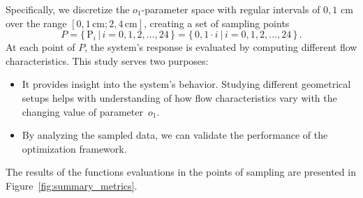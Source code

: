 Specifically, we discretize the $o_1$-parameter space with regular intervals of $0{,}1$ cm over the range $[0{,}1 \, \mathrm{cm}; 2{,}4 \, \mathrm{cm}]$, creating a set of sampling points
\begin{equation}
	P = \Big\{ \, \text{P}_i \, \big| \, i=0,1,2, \dots, 24 \, \Big\} = \Big\{ \, 0{,}1 \cdot i \: \big| \, i=0,1,2, \dots, 24 \, \Big\} \, .
\end{equation}
At each point of $P$, the system's response is evaluated by computing different flow characteristics. This study serves two purposes:
\begin{itemize}
	\item It provides insight into the system's behavior. Studying different geometrical setups helps with understanding of how flow characteristics vary with the changing value of parameter~$o_1$.
	\item By analyzing the sampled data, we can validate the performance of the optimization framework.
\end{itemize}
The results of the functions evaluations in the points of sampling are presented in Figure~\ref{fig:summary_metrics}.


